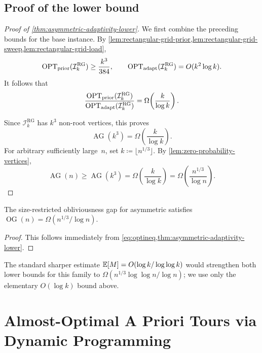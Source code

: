 \documentclass[12pt,a4paper,oneside]{report}
\begin{document}
\section{Proof of the lower bound}
\label{sec:asym-adapt-gap}

\begin{proof}[Proof of \cref{thm:asymmetric-adaptivity-lower}]
We first combine the preceding bounds for the base instance.  By
\cref{lem:rectangular-grid-prior,lem:rectangular-grid-sweep,lem:rectangular-grid-load},
\[
    \operatorname{OPT}_\mathrm{prior}(\mathcal I_k^{\mathrm{RG}})
    \ge \frac{k^3}{384},
    \qquad
    \operatorname{OPT}_\mathrm{adapt}(\mathcal I_k^{\mathrm{RG}})
    =O(k^2\log k).
\]
It follows that
\[
    \frac{\operatorname{OPT}_\mathrm{prior}(\mathcal I_k^{\mathrm{RG}})}
         {\operatorname{OPT}_\mathrm{adapt}(\mathcal I_k^{\mathrm{RG}})}
    =\Omega\!\left(\frac{k}{\log k}\right).
\]

Since $\mathcal I_k^{\mathrm{RG}}$ has $k^3$ non-root vertices, this proves
\[
    \operatorname{AG}(k^3)
    =\Omega\!\left(\frac{k}{\log k}\right).
\]
For arbitrary sufficiently large~$n$, set $k\coloneqq\lfloor n^{1/3}\rfloor$.
By \cref{lem:zero-probability-vertices},
\[
    \operatorname{AG}(n)
    \ge \operatorname{AG}(k^3)
    =\Omega\!\left(\frac{k}{\log k}\right)
    =\Omega\!\left(\frac{n^{1/3}}{\log n}\right).
\]
\end{proof}

\begin{corollary}\label{cor:asymmetric-obliviousness-lower}
The size-restricted obliviousness gap for asymmetric \StochTSP{} satisfies
$\operatorname{OG}(n)=\Omega(n^{1/3}/\log n)$.
\end{corollary}

\begin{proof}
This follows immediately from
\cref{eq:optineq,thm:asymmetric-adaptivity-lower}.
\end{proof}

The standard sharper estimate
$\mathbb{E}[M]=O(\log k/\log\log k)$ would strengthen both lower bounds for this
family to $\Omega(n^{1/3}\log\log n/\log n)$; we use only the elementary
$O(\log k)$ bound above.

\chapter{Almost-Optimal A Priori Tours via Dynamic Programming}\label{ch:dp}
\end{document}
